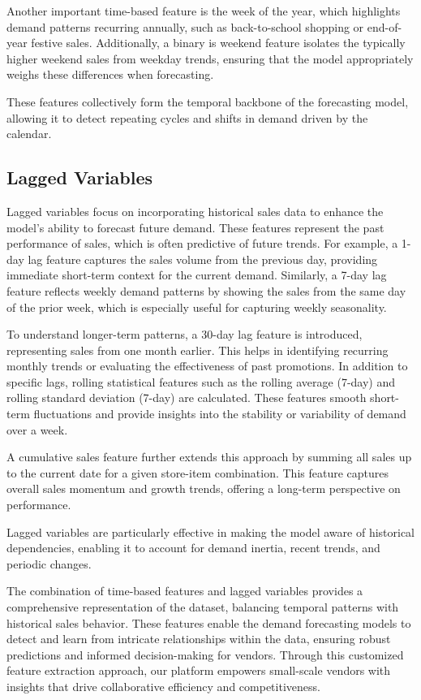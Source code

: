 Another important time-based feature is the week of the year, which highlights demand patterns recurring annually, such as back-to-school shopping or end-of-year festive sales. Additionally, a binary is weekend feature isolates the typically higher weekend sales from weekday trends, ensuring that the model appropriately weighs these differences when forecasting.

These features collectively form the temporal backbone of the forecasting model, allowing it to detect repeating cycles and shifts in demand driven by the calendar.

\subsection{Lagged Variables}

Lagged variables focus on incorporating historical sales data to enhance the model’s ability to forecast future demand. These features represent the past performance of sales, which is often predictive of future trends. For example, a 1-day lag feature captures the sales volume from the previous day, providing immediate short-term context for the current demand. Similarly, a 7-day lag feature reflects weekly demand patterns by showing the sales from the same day of the prior week, which is especially useful for capturing weekly seasonality.

To understand longer-term patterns, a 30-day lag feature is introduced, representing sales from one month earlier. This helps in identifying recurring monthly trends or evaluating the effectiveness of past promotions. In addition to specific lags, rolling statistical features such as the rolling average (7-day) and rolling standard deviation (7-day) are calculated. These features smooth short-term fluctuations and provide insights into the stability or variability of demand over a week.

A cumulative sales feature further extends this approach by summing all sales up to the current date for a given store-item combination. This feature captures overall sales momentum and growth trends, offering a long-term perspective on performance.

Lagged variables are particularly effective in making the model aware of historical dependencies, enabling it to account for demand inertia, recent trends, and periodic changes.


The combination of time-based features and lagged variables provides a comprehensive representation of the dataset, balancing temporal patterns with historical sales behavior. These features enable the demand forecasting models to detect and learn from intricate relationships within the data, ensuring robust predictions and informed decision-making for vendors. Through this customized feature extraction approach, our platform empowers small-scale vendors with insights that drive collaborative efficiency and competitiveness.

